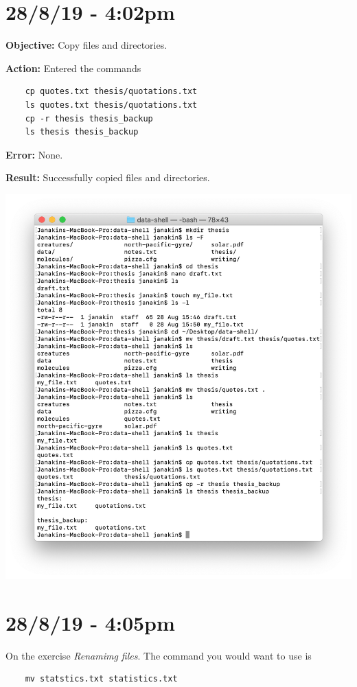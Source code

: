 \documentclass{article}
\begin{document}
\section*{28/8/19 - 4:02pm}

\textbf{Objective:} Copy files and directories.

\textbf{Action:} Entered the commands \begin{verbatim}
    cp quotes.txt thesis/quotations.txt
    ls quotes.txt thesis/quotations.txt
    cp -r thesis thesis_backup
    ls thesis thesis_backup
\end{verbatim}

\textbf{Error:} None.

\textbf{Result:} Successfully copied files and directories.

\includegraphics[width=\textwidth]{figi.png}

\section*{28/8/19 - 4:05pm}

On the exercise \textit{Renamimg files}. The command you would want to use is \begin{verbatim}
    mv statstics.txt statistics.txt
\end{verbatim}
\end{document}
